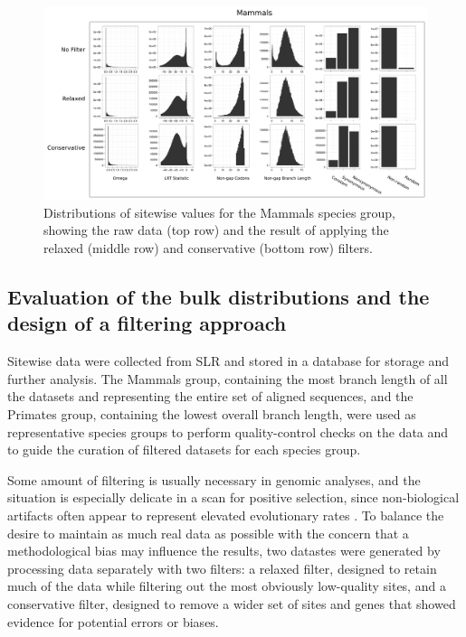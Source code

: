 \begin{landscape}
\begin{figure}
\centering
\includegraphics[scale=0.42]{Figs/qc_hist_mammals.pdf}
\caption{Distributions of sitewise values for the Mammals species
  group, showing the raw data (top row) and the result of applying the
  relaxed (middle row) and conservative (bottom row) filters.}
\label{fig_qc_hist_mammals}
\end{figure}
\end{landscape}

\subsection{Evaluation of the bulk distributions and the design of a filtering approach}
\label{section_sitewise_filtering}

Sitewise data were collected from SLR and stored in a database for
storage and further analysis. The Mammals group, containing the most
branch length of all the datasets and representing the entire set of
aligned sequences, and the Primates group, containing the lowest
overall branch length, were used as representative species groups to
perform quality-control checks on the \sw data and to guide the
curation of filtered \sw datasets for each species group.

Some amount of filtering is usually necessary in genomic analyses, and
the situation is especially delicate in a scan for positive selection,
since non-biological artifacts often appear to represent elevated
evolutionary rates
\citep{MarkovaRaina2011,Schneider2009,Mallick2009}. To balance the
desire to maintain as much real data as possible with the concern that
a methodological bias may influence the results, two datastes were
generated by processing \sw data separately with two filters: a
relaxed filter, designed to retain much of the data while filtering
out the most obviously low-quality sites, and a conservative filter,
designed to remove a wider set of sites and genes that showed evidence
for potential errors or biases.
 
